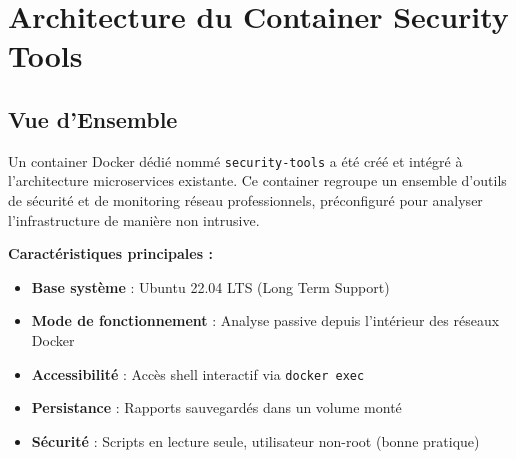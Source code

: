 \documentclass[11pt,a4paper]{report}
\begin{document}
\chapter{Architecture du Container Security Tools}

\section{Vue d'Ensemble}

Un container Docker dédié nommé \texttt{security-tools} a été créé et intégré à l'architecture microservices existante. Ce container regroupe un ensemble d'outils de sécurité et de monitoring réseau professionnels, préconfiguré pour analyser l'infrastructure de manière non intrusive.

\textbf{Caractéristiques principales :}
\begin{itemize}
    \item \textbf{Base système} : Ubuntu 22.04 LTS (Long Term Support)
    \item \textbf{Mode de fonctionnement} : Analyse passive depuis l'intérieur des réseaux Docker
    \item \textbf{Accessibilité} : Accès shell interactif via \texttt{docker exec}
    \item \textbf{Persistance} : Rapports sauvegardés dans un volume monté
    \item \textbf{Sécurité} : Scripts en lecture seule, utilisateur non-root (bonne pratique)
\end{itemize}
\end{document}
